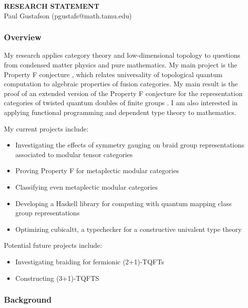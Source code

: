 \documentclass[12pt]{article}
\theoremstyle{plain} \numberwithin{equation}{section}
\theoremstyle{definition}
\begin{document}
\begin{center}
{\bf RESEARCH STATEMENT}\\
\vspace*{0.1cm}
{\normalsize Paul Gustafson (pgustafs@math.tamu.edu)}
\end{center}




\subsubsection*{Overview}

My research applies category theory and low-dimensional topology to questions from condensed matter physics and pure mathematics.   My main project is the Property F conjecture \cite{nr}, which relates universality of topological quantum computation to algebraic properties of fusion categories.  My main result is the proof of  an extended version of the Property F conjecture for the representation categories of twisted quantum doubles of finite groups \cite{g}. I am also interested in applying functional programming and dependent type theory to mathematics.  

My current projects include:
\begin{itemize}
\item Investigating the effects of symmetry gauging on braid group representations associated to modular tensor categories
\item Proving Property F for metaplectic modular categories
\item Classifying even metaplectic modular categories
\item Developing a Haskell library for computing with quantum mapping class group representations
\item Optimizing cubicaltt, a typechecker for a constructive univalent type theory
\end{itemize}

Potential future projects include:
\begin{itemize}
  \item Investigating braiding for fermionic (2+1)-TQFTs
  \item Constructing (3+1)-TQFTS
\end{itemize}


\subsubsection*{Background}
\end{document}
